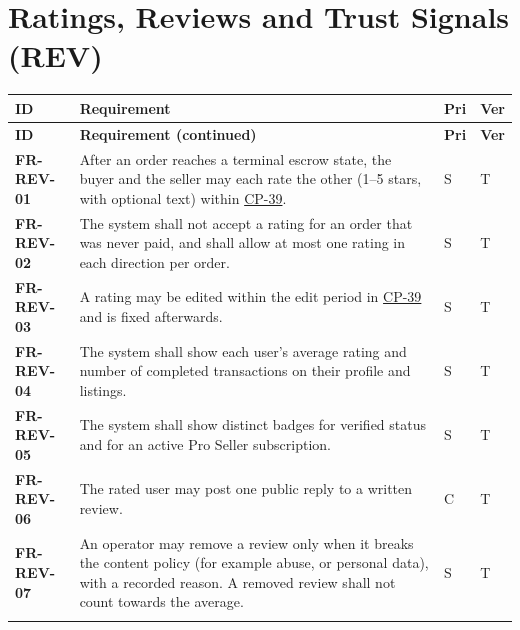 \documentclass[11pt,a4paper]{report}
\makeatletter
\newenvironment{reqs}{%
  \small
  \begin{longtable}{@{}>{\raggedright\arraybackslash}p{2.35cm}
                       >{\raggedright\arraybackslash}p{10.3cm}
                       >{\centering\arraybackslash}p{0.7cm}
                       >{\centering\arraybackslash}p{0.7cm}@{}}
  \toprule
  \textbf{ID} & \textbf{Requirement} & \textbf{Pri} & \textbf{Ver} \\
  \midrule
  \endfirsthead
  \toprule
  \textbf{ID} & \textbf{Requirement (continued)} & \textbf{Pri} & \textbf{Ver} \\
  \midrule
  \endhead
  \bottomrule
  \endfoot
}{\end{longtable}}
\newcommand{\req}[5]{\leavevmode\textbf{#1}\hypertarget{#1}{} & #5 & #2 & #3 \\ \addlinespace[2pt]}
\newcommand{\cp}[1]{\hyperlink{#1}{#1}}
\makeatother
\begin{document}
\section{Ratings, Reviews and Trust Signals (REV)}
\begin{reqs}
\req{FR-REV-01}{S}{T}{FR-65}{After an order reaches a terminal escrow state, the buyer and the seller may each rate the other (1--5 stars, with optional text) within \cp{CP-39}.}
\req{FR-REV-02}{S}{T}{FR-66}{The system shall not accept a rating for an order that was never paid, and shall allow at most one rating in each direction per order.}
\req{FR-REV-03}{S}{T}{new}{A rating may be edited within the edit period in \cp{CP-39} and is fixed afterwards.}
\req{FR-REV-04}{S}{T}{FR-67}{The system shall show each user's average rating and number of completed transactions on their profile and listings.}
\req{FR-REV-05}{S}{T}{FR-68}{The system shall show distinct badges for verified status and for an active Pro Seller subscription.}
\req{FR-REV-06}{C}{T}{new}{The rated user may post one public reply to a written review.}
\req{FR-REV-07}{S}{T}{new}{An operator may remove a review only when it breaks the content policy (for example abuse, or personal data), with a recorded reason. A removed review shall not count towards the average.}
\end{reqs}
\end{document}
